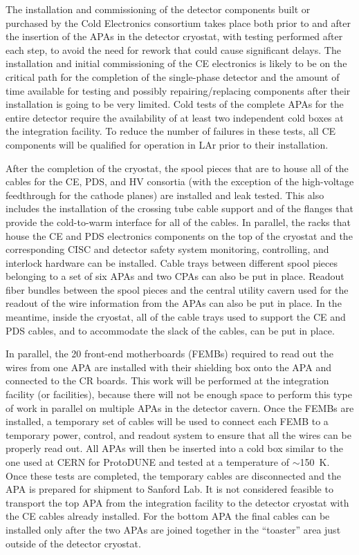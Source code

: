 The installation and commissioning of the detector components built or
purchased by the Cold Electronics consortium takes place both prior to
and after the insertion of the APAs in the
detector cryostat, with testing performed after each step, to avoid the
need for rework that could cause significant delays. The installation and
initial commissioning of the CE electronics is likely to be on the critical
path for the completion of the single-phase detector and the amount of
time available for testing and possibly repairing/replacing components
after their installation is going to be very limited. Cold tests of the complete
APAs for the entire detector require the
availability of at least two independent cold boxes at the integration facility.
To reduce the number of failures in these tests, all CE components will
be qualified for operation in LAr prior to their installation.

After the completion of the cryostat, the spool pieces that are to house all of
the cables for the CE, PDS, and HV consortia (with the exception of the
high-voltage feedthrough for the cathode planes) are installed and leak tested.
This also includes the installation of the crossing tube cable support and of
the flanges that provide the cold-to-warm interface for all of the cables.
In parallel, the racks that house the CE and PDS electronics components on
the top of the cryostat and the corresponding CISC and detector safety
system monitoring, controlling, and interlock hardware can be installed.
Cable trays between different spool pieces belonging to a set of six APAs
and two CPAs can also be put in place. Readout fiber bundles between the
spool pieces and the central utility cavern used for the readout of the wire
information from the APAs can also be put in place. In the meantime, inside
the cryostat, all of the cable trays used to support the CE and PDS cables, and
to accommodate the slack of the cables, can be put in place.

In parallel, the 20 front-end motherboards (FEMBs) required to read out the
wires from one APA are installed with their shielding box onto the APA and
connected to the CR boards. This work will be performed at the integration
facility (or facilities), because there will not be enough space to perform
this type of work in parallel on multiple APAs in the detector cavern. Once
the FEMBs are installed, a temporary set of cables will be
used to connect each FEMB to a temporary power, control, and readout system
to ensure that all the wires can be properly read out. All APAs
will then be inserted into a cold box similar
to the one used at CERN for ProtoDUNE and tested at a temperature of
$\sim$150~K. Once these tests
are completed, the temporary cables are disconnected and the APA is prepared
for shipment to Sanford Lab. It is not considered feasible to transport the
top APA from the integration facility to the detector cryostat with the
CE cables already installed. For the bottom APA the final cables can be
installed only after the two APAs are joined together in the ``toaster'' area
just outside of the detector cryostat.

